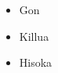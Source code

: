 \documentclass{article}
\begin{document}
	\begin{itemize}
		\item Gon
		\item Killua
		\item Hisoka
	\end{itemize}
\end{document}
